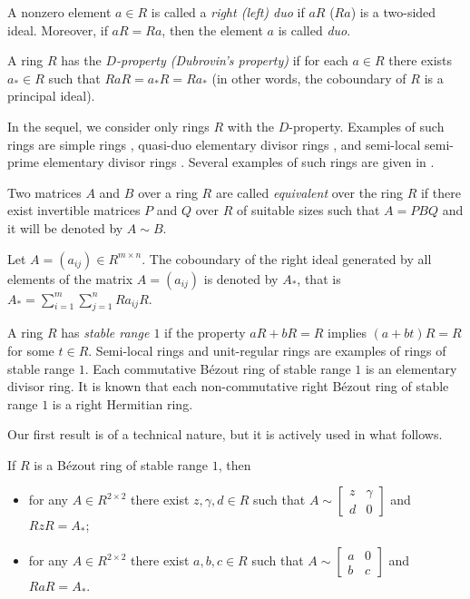 \documentclass{cimart}
\begin{document}
A nonzero element $a\in R$ is called a {\it right (left) duo} if $aR$ ($Ra$) is a two-sided ideal. Moreover,  if  $aR=Ra$,   then the element $a$ is called {\it duo}.

A ring   $R$ has the {\it  $D$-property (Dubrovin's property)}  \cite[p.\,33]{1-zabavsky} if for each  $a\in R$ there exists  $a_*\in R$ such that $RaR=a_*R=Ra_*$ (in other words, the  coboundary of $R$ is a   principal ideal).

In the sequel, we  consider  only  rings $R$ with the $D$-property. Examples of such rings are simple rings \cite[\S 4.2]{1-zabavsky}, quasi-duo elementary divisor rings \cite[Theorem 1]{2-zabkom}, and semi-local semi-prime elementary divisor rings \cite[Theorem 1]{3-dubrovin}. Several examples of such rings are given in \cite{Bovdi_Zabavsky_2}.




Two matrices $A$ and $B$ over a ring $R$ are called {\it equivalent} over the ring $R$ if there exist invertible matrices $P$ and $Q$ over $R$ of  suitable sizes such  that $A=PBQ$ and it will be  denoted by $A\sim B$.

Let $A=(a_{ij})\in R^{m\times n}$.  The coboundary of the right ideal generated by all  elements of the  matrix $A=(a_{ij})$  is  denoted by $A_*$,
that is
$A_*=\sum\limits_{i=1}^m\sum\limits_{j=1}^n Ra_{ij}R$.


A ring $R$  has  {\it  stable range $1$}  if the property $aR+bR=R$ implies $(a+bt)R=R$ for some $t\in R$.  Semi-local rings and  unit-regular rings \cite[p.\,45]{1-zabavsky} are examples of  rings of stable range $1$. Each  commutative   B\'ezout ring of  stable range $1$ is an elementary divisor ring. It is known \cite[Theorem 2]{4-zabavsky} that each   non-commutative  right B\'ezout ring  of stable range $1$ is a right Hermitian ring.



Our first result is of a technical nature, but it is actively used in what follows.

\begin{theorem}\label{ThR:1}
If  $R$ is  a B\'ezout ring  of stable range $1$, then
\begin{itemize}
\item[(i)] for any  $A\in  R^{2\times 2}$ there exist $z,\gamma,d\in R$ such that $A \sim \left[\begin{array}{cc}
z & \gamma \\
d & 0
\end{array}
\right]
$ and    $RzR=A_*$;

\item[(ii)] for any  $A\in R^{2\times 2}$ there exist $a,b,c\in R$ such that $A\sim
\left[\begin{array}{cc}
          a & 0 \\
          b & c
        \end{array}\right]$ and $RaR=A_*$.
\end{itemize}
\end{theorem}
\end{document}
